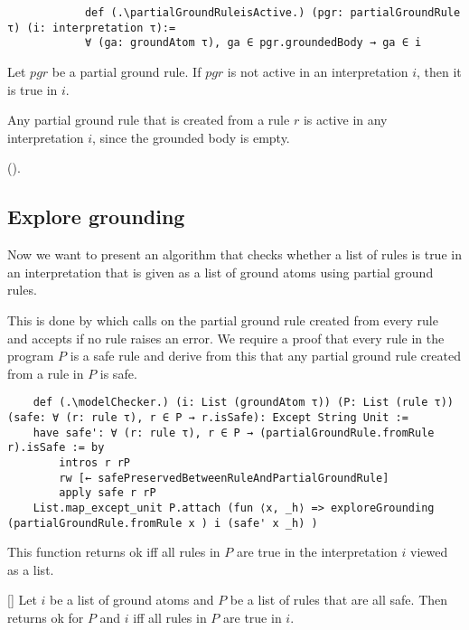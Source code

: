         \begin{lstlisting}
            def (.\partialGroundRuleisActive.) (pgr: partialGroundRule τ) (i: interpretation τ):=
            ∀ (ga: groundAtom τ), ga ∈ pgr.groundedBody → ga ∈ i 
        \end{lstlisting}

        \begin{lemma}[\notActiveRuleIsTrue]
            Let $pgr$ be a partial ground rule. If $pgr$ is not active in an interpretation $i$, then it is true in $i$.
        \end{lemma}

        Any partial ground rule that is created from a rule $r$ is active in any interpretation $i$, since the grounded body is empty.
        
        (\partialGroundRulefromRuleIsActive).

    \subsection{Explore grounding}

    Now we want to present an algorithm that checks whether a list of rules is true in an interpretation that is given as a list of ground atoms using partial ground rules.
    
    This is done by \modelChecker which calls \exploreGrounding on the partial ground rule created from every rule and accepts if no rule raises an error. We require a proof that every rule in the program $P$ is a safe rule and derive from this that any partial ground rule created from a rule in $P$ is safe.

    \begin{lstlisting}
    def (.\modelChecker.) (i: List (groundAtom τ)) (P: List (rule τ)) (safe: ∀ (r: rule τ), r ∈ P → r.isSafe): Except String Unit :=
    have safe': ∀ (r: rule τ), r ∈ P → (partialGroundRule.fromRule r).isSafe := by
        intros r rP
        rw [← safePreservedBetweenRuleAndPartialGroundRule]
        apply safe r rP
    List.map_except_unit P.attach (fun ⟨x, _h⟩ => exploreGrounding (partialGroundRule.fromRule x ) i (safe' x _h) )
    \end{lstlisting}
    
    This function returns ok iff all rules in $P$ are true in the interpretation $i$ viewed as a list.

    \begin{theorem}\label{trm:modelChecker}[\modelCheckerUnitIffAllRulesTrue]
        Let $i$ be a list of ground atoms and $P$ be a list of rules that are all safe. Then \modelChecker returns ok for $P$ and $i$ iff all rules in $P$ are true in $i$.
    \end{theorem}

